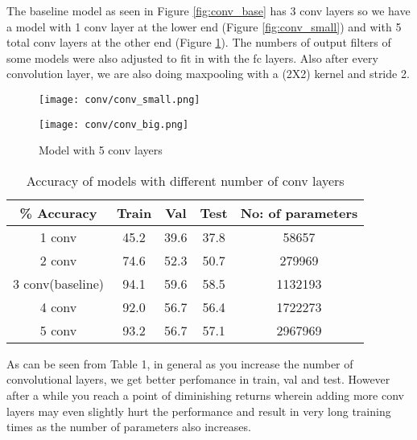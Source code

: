 \documentclass{article}
\begin{document}
\noindent
The baseline model as seen in Figure \ref{fig:conv_base} has 3 conv layers so we have a model with 1 conv layer at the lower end (Figure \ref{fig:conv_small}) and with 5 total conv layers at the other end (Figure \ref{fig:conv_big}). The numbers of output filters of some models were also adjusted to fit in with the fc layers. Also after every convolution layer, we are also doing maxpooling with a (2X2) kernel and stride 2.

\begin{figure}
\centering
\begin{minipage}{.5\linewidth}
  \centering
  \texttt{[image: conv/conv\_small.png]}
  \caption{Model with 1 conv layer}
  \label{fig:conv_small}
\end{minipage}%
\begin{minipage}{.5\textwidth}
  \centering
  \texttt{[image: conv/conv\_big.png]}
  \caption{Model with 5 conv layers}
  \label{fig:conv_big}
\end{minipage}
\end{figure}


\begin{table}[h!]

\begin{center}
 \begin{tabular}{||c | c c c| c||} 
 
 \hline
\% Accuracy  &  Train &  Val & Test & No: of parameters\\ [0.5ex] 
 \hline\hline
 1 conv & 45.2 & 39.6 & 37.8 & 58657\\ 
 \hline
 2 conv & 74.6 & 52.3 & 50.7 & 279969\\
 \hline
 3 conv(baseline) & 94.1 & 59.6 & 58.5 & 1132193\\
 \hline
 4 conv & 92.0 & 56.7 & 56.4 & 1722273\\
 \hline
 5 conv & 93.2 & 56.7 & 57.1 & 2967969\\
 \hline

\end{tabular}
\end{center}
\vspace{-1.0em}
\caption{Accuracy of models with different number of conv layers} 
\end{table}

\noindent
As can be seen from Table 1, in general as you increase the number of convolutional layers, we get better perfomance in train, val and test. However after a while you reach a point of diminishing returns wherein adding more conv layers may even slightly hurt the performance and result in very long training times as the number of parameters also increases.
\\
\end{document}
